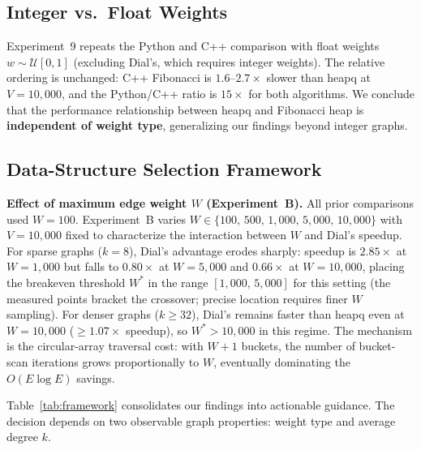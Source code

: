\documentclass[conference]{IEEEtran}
\begin{document}
\subsection{Integer vs.\ Float Weights}

Experiment~9 repeats the Python and C++ comparison with float weights
$w\sim\mathcal{U}[0,1]$ (excluding Dial's, which requires integer
weights).  The relative ordering is unchanged: C++ Fibonacci is
$1.6$--$2.7\times$ slower than heapq at $V=10{,}000$, and the Python/C++
ratio is $15\times$ for both algorithms.  We conclude that the performance
relationship between heapq and Fibonacci heap is \textbf{independent of
weight type}, generalizing our findings beyond integer graphs.

\subsection{Data-Structure Selection Framework}
\label{sec:framework}

\noindent\textbf{Effect of maximum edge weight $W$ (Experiment~B).}
All prior comparisons used $W{=}100$.  Experiment~B varies $W\in\{100,\,500,\,1{,}000,\,5{,}000,\,10{,}000\}$
with $V{=}10{,}000$ fixed to characterize the interaction between $W$ and
Dial's speedup.  For sparse graphs ($k{=}8$), Dial's advantage erodes
sharply: speedup is $2.85\times$ at $W{=}1{,}000$ but falls to $0.80\times$
at $W{=}5{,}000$ and $0.66\times$ at $W{=}10{,}000$, placing the
breakeven threshold $W^{*}$ in the range $[1{,}000,\,5{,}000]$ for this
setting (the measured points bracket the crossover; precise location
requires finer $W$ sampling).  For denser
graphs ($k{\geq}32$), Dial's remains faster than heapq even at $W{=}10{,}000$
(${\geq}1.07\times$ speedup), so $W^{*}{>}10{,}000$ in this regime.  The
mechanism is the circular-array traversal cost: with $W{+}1$ buckets,
the number of bucket-scan iterations grows proportionally to $W$, eventually
dominating the $O(E\log E)$ savings.

Table~\ref{tab:framework} consolidates our findings into actionable
guidance.  The decision depends on two observable graph properties:
weight type and average degree $k$.
\end{document}
